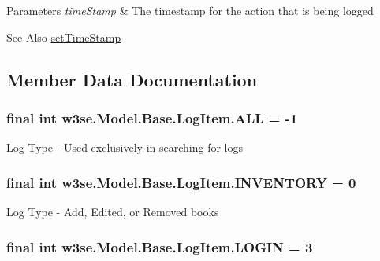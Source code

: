\begin{DoxyParams}{Parameters}
{\em time\-Stamp} & The timestamp for the action that is being logged \\
\hline
\end{DoxyParams}
\begin{DoxySeeAlso}{See Also}
\hyperlink{classw3se_1_1_model_1_1_base_1_1_log_item_a83e14fdacc008bec389705e0b9a21e6f}{set\-Time\-Stamp} 
\end{DoxySeeAlso}


\subsection{Member Data Documentation}
\hypertarget{classw3se_1_1_model_1_1_base_1_1_log_item_a3d096f4b0f6b7c06440a21d96b38b354}{
\subsubsection[{A\-L\-L}]{\setlength{\rightskip}{0pt plus 5cm}final int w3se.\-Model.\-Base.\-Log\-Item.\-A\-L\-L = -\/1\hspace{0.3cm}{\ttfamily [static]}}}\label{classw3se_1_1_model_1_1_base_1_1_log_item_a3d096f4b0f6b7c06440a21d96b38b354}
Log Type -\/ Used exclusively in searching for logs \hypertarget{classw3se_1_1_model_1_1_base_1_1_log_item_a7141965c98c3ed33290ed768d4d58f4c}{
\subsubsection[{I\-N\-V\-E\-N\-T\-O\-R\-Y}]{\setlength{\rightskip}{0pt plus 5cm}final int w3se.\-Model.\-Base.\-Log\-Item.\-I\-N\-V\-E\-N\-T\-O\-R\-Y = 0\hspace{0.3cm}{\ttfamily [static]}}}\label{classw3se_1_1_model_1_1_base_1_1_log_item_a7141965c98c3ed33290ed768d4d58f4c}
Log Type -\/ Add, Edited, or Removed books \hypertarget{classw3se_1_1_model_1_1_base_1_1_log_item_ada91e98d7b1752f49a56677e685b133d}{
\subsubsection[{L\-O\-G\-I\-N}]{\setlength{\rightskip}{0pt plus 5cm}final int w3se.\-Model.\-Base.\-Log\-Item.\-L\-O\-G\-I\-N = 3\hspace{0.3cm}{\ttfamily [static]}}}\label{classw3se_1_1_model_1_1_base_1_1_log_item_ada91e98d7b1752f49a56677e685b133d}
